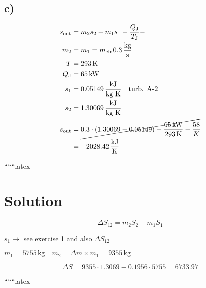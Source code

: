 

\subsection*{c)}
\begin{align*}
s_{\text{out}} &= m_2 s_2 - m_1 s_1 - \frac{Q_{\text{J}}}{T_{\text{J}}} - \\
m_2 &= m_1 = m_{\text{ein}} 0.3 \, \frac{\text{kg}}{\text{s}} \\
T &= 293 \, \text{K} \\
Q_{\text{J}} &= 65 \, \text{kW} \\
s_1 &= 0.05149 \, \frac{\text{kJ}}{\text{kg K}} \quad \text{turb. A-2} \\
s_2 &= 1.30069 \, \frac{\text{kJ}}{\text{kg K}} \\
s_{\text{out}} &= \cancel{0.3 \cdot (1.30069 - 0.05149) - \frac{65 \, \text{kW}}{293 \, \text{K}} - \frac{58}{K}} \\
&= -2028.42 \, \frac{\text{kJ}}{\text{K}}
\end{align*}

``````latex


\section*{Solution}

\begin{equation}
\Delta S_{12} = m_2 S_2 - m_1 S_1
\end{equation}

\noindent
$s_1 \rightarrow$ see exercise 1 and also $\Delta S_{12}$

\noindent
$m_1 = 5755 \, \text{kg} \quad m_2 = \Delta m \times m_1 = 9355 \, \text{kg}$

\begin{equation}
\Delta S = 9355 \cdot 1.3069 - 0.1956 \cdot 5755 = 6733.97
\end{equation}

``````latex